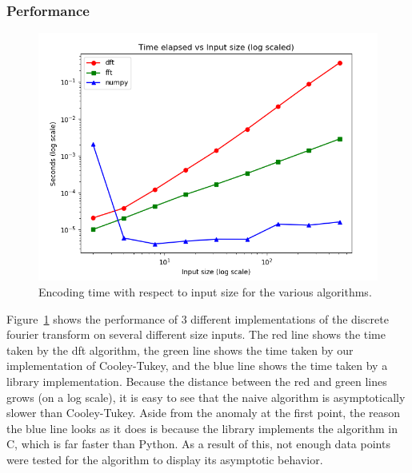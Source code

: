 	\subsubsection{Performance}
		\begin{figure}[h]
			\includegraphics[width=\linewidth]{images/perfGraph.png}
			\caption{Encoding time with respect to input size for the various algorithms.}
			\label{fig:performance}
		\end{figure}
		Figure~\ref{fig:performance} shows the performance of 3 different implementations of the discrete fourier transform on several different size inputs. The red line shows the time taken by the dft algorithm, the green line shows the time taken by our implementation of Cooley-Tukey, and the blue line shows the time taken by a library implementation. Because the distance between the red and green lines grows (on a log scale), it is easy to see that the naive algorithm is asymptotically slower than Cooley-Tukey. Aside from the anomaly at the first point, the reason the blue line looks as it does is because the library implements the algorithm in C, which is far faster than Python. As a result of this, not enough data points were tested for the algorithm to display its asymptotic behavior.
